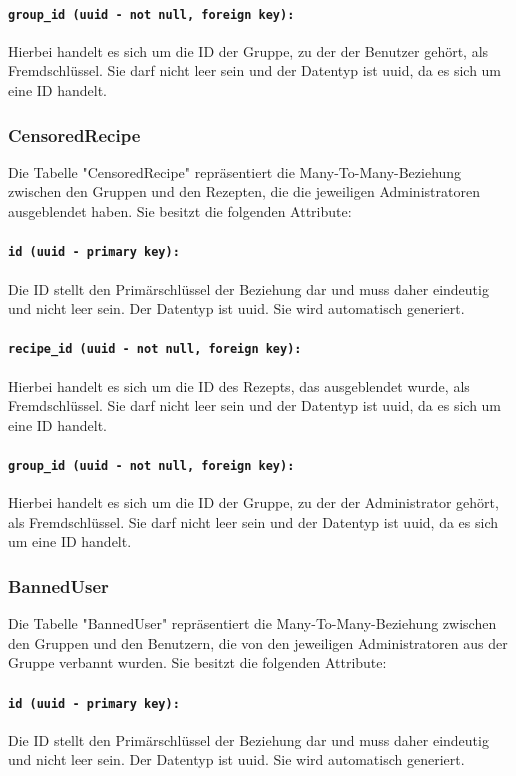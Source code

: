 \documentclass{entwurfsheft}
\begin{document}
\begin{sloppypar}
\paragraph{\texttt{group\_id (uuid - not null, foreign key):}} Hierbei handelt es sich um die ID der Gruppe, zu der der Benutzer gehört, als Fremdschlüssel. Sie darf nicht leer sein und der Datentyp ist \Gls{uuid}, da es sich um eine ID handelt.
\newpage
\subsubsection{CensoredRecipe}
Die Tabelle "CensoredRecipe" repräsentiert die Many-To-Many-Beziehung zwischen den Gruppen und den Rezepten, die die jeweiligen Administratoren ausgeblendet haben. Sie besitzt die folgenden Attribute:
\paragraph{\texttt{id (uuid - primary key):}} Die ID stellt den Primärschlüssel der Beziehung dar und muss daher eindeutig und nicht leer sein. Der Datentyp ist \Gls{uuid}. Sie wird automatisch generiert.
\paragraph{\texttt{recipe\_id (uuid - not null, foreign key):}} Hierbei handelt es sich um die ID des Rezepts, das ausgeblendet wurde, als Fremdschlüssel. Sie darf nicht leer sein und der Datentyp ist \Gls{uuid}, da es sich um eine ID handelt.
\paragraph{\texttt{group\_id (uuid - not null, foreign key):}} Hierbei handelt es sich um die ID der Gruppe, zu der der Administrator gehört, als Fremdschlüssel. Sie darf nicht leer sein und der Datentyp ist \Gls{uuid}, da es sich um eine ID handelt.
\newpage

\subsubsection{BannedUser}
Die Tabelle "BannedUser" repräsentiert die Many-To-Many-Beziehung zwischen den Gruppen und den Benutzern, die von den jeweiligen Administratoren aus der Gruppe verbannt wurden. Sie besitzt die folgenden Attribute:
\paragraph{\texttt{id (uuid - primary key):}} Die ID stellt den Primärschlüssel der Beziehung dar und muss daher eindeutig und nicht leer sein. Der Datentyp ist \Gls{uuid}. Sie wird automatisch generiert.

\end{sloppypar}
\end{document}
